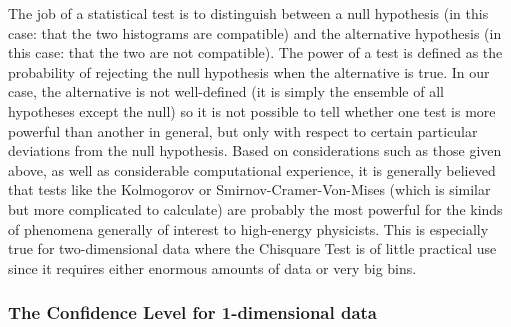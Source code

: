 The job of a statistical test is to distinguish between a
null hypothesis (in this case: that the two histograms are
compatible) and the alternative hypothesis (in this case:
that the two are not compatible). The power of a test is defined
as the probability of rejecting the null hypothesis when the
alternative is true. In our case, the alternative is not
well-defined (it is simply the ensemble of all hypotheses
except the null) so it is not possible to tell whether one test
is more powerful than another
in general, but only with respect to certain particular
deviations from the null hypothesis.
Based on considerations such as those given above, as well as
considerable computational experience, it is generally believed
that tests like the Kolmogorov or
Smirnov-Cramer-Von-Mises
(which is similar but more complicated to calculate)
are probably the most powerful for the kinds of phenomena
generally of interest to high-energy physicists.
This is especially true for two-dimensional data where
the Chisquare Test is of little practical use since it requires
either enormous amounts of data or very big bins.
 
\subsubsection*{The Confidence Level for 1-dimensional data}
 
